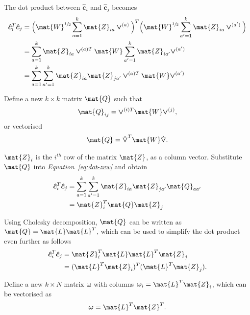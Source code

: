 \documentclass[12pt]{report}
\begin{document}
%
%


The dot product between $\bm{\hat{c}}_i$ and $\bm{\hat{c}}_j$ becomes
\begin{align}
  \bm{\hat{c}}^T_i \bm{\hat{c}}_j &=
    \Big(\mat{W}^{\sfrac{1}{2}} \sum_{a=1}^{k} \mat{Z}_{ia} \bm{\vee}^{(a)} \Big)^T
    \Big(\mat{W}^{\sfrac{1}{2}} \sum_{a'=1}^{k} \mat{Z}_{ia} \bm{\vee}^{(a')} \Big)
  \\
  &= \sum_{a=1}^{k} \mat{Z}_{ia} \bm{\vee}^{(a)T} \mat{W}
    \sum_{a'=1}^{k} \mat{Z}_{ia'} \bm{\vee}^{(a')}
  \\
  &= \sum_{a=1}^k \sum_{a'=1}^k \mat{Z}_{ia} \mat{Z}_{ja'}
    \bm{\vee}^{(a)T} \mat{W} \bm{\vee}^{(a')} \label{eq:dot-zvw}
\end{align}


%
%


Define a new $k \times k$ matrix $\mat{Q}$ such that
\begin{equation}
  \label{eq:q-ij}
  \mat{Q}_{ij} = \bm{\vee}^{(i)T} \mat{W} \bm{\vee}^{(j)},
\end{equation}
or vectorised
\begin{equation}
  \label{eq:q-vectorised}
  \mat{Q} = \bm{\hat{\vee}}^T \mat{W} \bm{\hat{\vee}}.
\end{equation}

$\mat{Z}_i$ is the $i^{th}$ row of the matrix $\mat{Z}$, as a column vector.
Substitute $\mat{Q}$ into \emph{Equation~\ref{eq:dot-zvw}} and obtain
\begin{align}
  \bm{\hat{c}}_i^T \bm{\hat{c}}_j &= \sum_{a=1}^k \sum_{a'=1}^k
    \mat{Z}_{ia} \mat{Z}_{ja'} \mat{Q}_{aa'} \label{eq:dot-zq-sum} \\
  &= \mat{Z}_i^T \mat{Q} \mat{Z}_j \label{eq:dot-zq-vectorised}
\end{align}


Using Cholesky decomposition, $\mat{Q}$ can be written as $\mat{Q} = \mat{L}
\mat{L}^T$, which can be used to simplify the dot product even further as
follows
\begin{align}
  \bm{\hat{c}}_i^T \bm{\hat{c}}_j &= \mat{Z}_i^T \mat{L} \mat{L}^T \mat{Z}_j \\
   &= (\mat{L}^T \mat{Z}_i)^T (\mat{L}^T \mat{Z}_j).
\end{align}

Define a new $k \times N$ matrix $\bm{\omega}$ with columns
$\bm{\omega}_i = \mat{L}^T \mat{Z}_i$, which can be vectorised as
\begin{equation}
  \bm{\omega} = \mat{L}^T \mat{Z}^T.
\end{equation}
\end{document}
